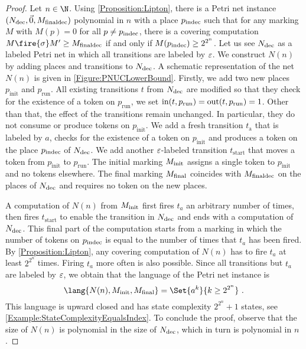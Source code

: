 \documentclass[../../diss.tex]{subfiles}
\begin{document}
\begin{proof}
    Let $n \in \N$.
    Using \cref{Proposition:Lipton}, there is a Petri net instance $(N_{\text{dec}},\vec{0},M_{{\text{final}}{\text{dec}}})$ polynomial in $n$ with a place $p_{\text{indec}}$ such that for any marking $M$ with $M(p) = 0$ for all $p \neq p_{\text{indec}}$, there is a covering computation $M \fire{\sigma} M' \geq \Mfinaldec$ if and only if $M(p_{\text{indec}}) \geq 2^{2^n}$.
    Let us see $N_{\text{dec}}$ as a labeled Petri net in which all transitions are labeled by $\varepsilon$.
    We construct $N(n)$ by adding places and transitions to $N_{\text{dec}}$.
    A schematic representation of the net $N(n)$ is given in \cref{Figure:PNUCLowerBound}.
    Firstly, we add two new places $p_{\text{init}}$ and $p_{\text{run}}$.
    All existing transitions $t$ from $N_{\text{dec}}$ are modified so that they check for the existence of a token on $p_{\text{run}}$, \ie we set $\text{in}(t,p_{\text{run}}) = \text{out}(t,p_{\text{run}}) = 1$.
    Other than that, the effect of the transitions remain unchanged.
    In particular, they do not consume or produce tokens on $p_{\text{init}}$.
    We add a fresh transition $t_{\text{a}}$ that is labeled by $a$, checks for the existence of a token on $p_{\text{init}}$ and produces a token on the place $p_{\text{indec}}$ of $N_{\text{dec}}$.
    We add another $\varepsilon$-labeled transition $t_{\text{start}}$ that moves a token from $p_{\text{init}}$ to $p_{\text{run}}$.
    The initial marking $M_{\text{init}}$ assigns a single token to $p_{\text{init}}$ and no tokens elsewhere.
    The final marking $M_{\text{final}}$ coincides with $M_{{\text{final}}{\text{dec}}}$ on the places of $N_{\text{dec}}$ and requires no token on the new places.

    A computation of $N(n)$ from $M_{\text{init}}$ first fires $t_{a}$ an arbitrary number of times, then fires $t_{\text{start}}$ to enable the transition in $N_{\text{dec}}$ and ends with a computation of $N_{\text{dec}}$.
    This final part of the computation starts from a marking in which the number of tokens on $p_{\text{indec}}$ is equal to the number of times that $t_{a}$ has been fired.
    By \cref{Proposition:Lipton}, any covering computation of $N(n)$ has to fire $t_{a}$ at least $2^{2^n}$ times.
    Firing $t_{a}$ more often is also possible.
    Since all transitions but $t_{a}$ are labeled by $\varepsilon$, we obtain that the language of the Petri net instance is
    \[
        \lang{N(n),\Minit,\Mfinal} = \Set{ a^k}{k \geq 2^{2^n}}
        \ .
    \]
    This language is upward closed and has state complexity $2^{2^n} + 1$ states, see \cref{Example:StateComplexityEqualsIndex}.
    To conclude the proof, observe that the size of $N(n)$ is polynomial in the size of $N_{\text{dec}}$, which in turn is polynomial in $n$.
\end{proof}
\end{document}
